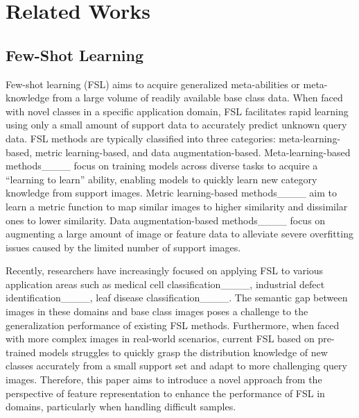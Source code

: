 \section{Related Works}
\label{sec:related}



\subsection{Few-Shot Learning}

{\color{recolor}Few-shot learning (FSL) aims to acquire generalized meta-abilities or meta-knowledge from a large volume of readily available base class data. When faced with novel classes in a specific application domain, FSL facilitates rapid learning using only a small amount of support data to accurately predict unknown query data.}
FSL methods are typically classified into three categories: meta-learning-based, metric learning-based, and data augmentation-based. 
Meta-learning-based methods____ focus on training models across diverse tasks to acquire a ``learning to learn'' ability, enabling models to quickly learn new category knowledge from support images.
Metric learning-based methods____ aim to learn a metric function to map similar images to higher similarity and dissimilar ones to lower similarity. 
Data augmentation-based methods____ focus on augmenting a large amount of image or feature data to alleviate severe overfitting issues caused by the limited number of support images.

Recently, researchers have increasingly focused on applying FSL to various application areas such as medical cell classification____, industrial defect identification____, leaf disease classification____. The semantic gap between images in these domains and base class images poses a challenge to the generalization performance of existing FSL methods. Furthermore, when faced with more complex images in real-world scenarios, current FSL based on pre-trained models struggles to quickly grasp the distribution knowledge of new classes accurately from a small support set and adapt to more challenging query images. Therefore, this paper aims to introduce a novel approach from the perspective of feature representation to enhance the performance of FSL in domains, particularly when handling difficult samples.

